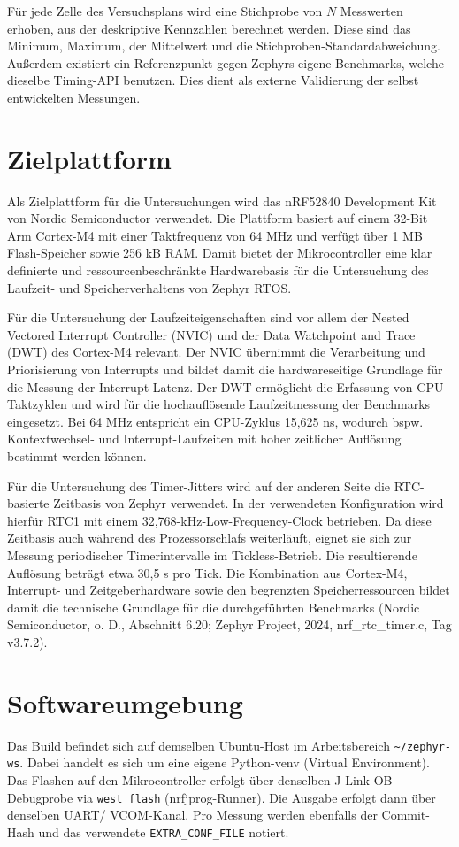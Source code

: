 F{\"u}r jede Zelle des Versuchsplans wird eine Stichprobe von \(N\) Messwerten erhoben, aus der deskriptive Kennzahlen berechnet werden. Diese sind das Minimum, Maximum, der Mittelwert und die Stichproben-Standardabweichung. Au{\ss}erdem existiert ein Referenzpunkt gegen Zephyrs eigene Benchmarks, welche dieselbe Timing-API benutzen. Dies dient als externe Validierung der selbst entwickelten Messungen.

\section{Zielplattform}
Als Zielplattform f{\"u}r die Untersuchungen wird das nRF52840 Development Kit von Nordic Semiconductor verwendet. Die Plattform basiert auf einem 32-Bit Arm Cortex-M4 mit einer Taktfrequenz von 64 MHz und verf{\"u}gt {\"u}ber 1 MB Flash-Speicher sowie 256 kB RAM. Damit bietet der Mikrocontroller eine klar definierte und ressourcenbeschr{\"a}nkte Hardwarebasis f{\"u}r die Untersuchung des Laufzeit- und Speicherverhaltens von Zephyr RTOS.

F{\"u}r die Untersuchung der Laufzeiteigenschaften sind vor allem der Nested Vectored Interrupt Controller (NVIC) und der Data Watchpoint and Trace (DWT) des Cortex-M4 relevant. Der NVIC {\"u}bernimmt die Verarbeitung und Priorisierung von Interrupts und bildet damit die hardwareseitige Grundlage f{\"u}r die Messung der Interrupt-Latenz. Der DWT erm{\"o}glicht die Erfassung von CPU-Taktzyklen und wird f{\"u}r die hochaufl{\"o}sende Laufzeitmessung der Benchmarks eingesetzt. Bei 64 MHz entspricht ein CPU-Zyklus 15,625 ns, wodurch bspw. Kontextwechsel- und Interrupt-Laufzeiten mit hoher zeitlicher Aufl{\"o}sung bestimmt werden k{\"o}nnen.

F{\"u}r die Untersuchung des Timer-Jitters wird auf der anderen Seite die RTC-basierte Zeitbasis von Zephyr verwendet. In der verwendeten Konfiguration wird hierf{\"u}r RTC1 mit einem 32,768-kHz-Low-Frequency-Clock betrieben. Da diese Zeitbasis auch w{\"a}hrend des Prozessorschlafs weiterl{\"a}uft, eignet sie sich zur Messung periodischer Timerintervalle im Tickless-Betrieb. Die resultierende Aufl{\"o}sung betr{\"a}gt etwa 30,5 \textmu{}s pro Tick. Die Kombination aus Cortex-M4, Interrupt- und Zeitgeberhardware sowie den begrenzten Speicherressourcen bildet damit die technische Grundlage f{\"u}r die durchgef{\"u}hrten Benchmarks (Nordic Semiconductor, o. D., Abschnitt 6.20; Zephyr Project, 2024, nrf\_rtc\_timer.c, Tag v3.7.2).

\section{Softwareumgebung}
Das Build befindet sich auf demselben Ubuntu-Host im Arbeitsbereich \lstinline[style=fileinline]|~/zephyr-ws|. Dabei handelt es sich um eine eigene Python-venv (Virtual Environment). Das Flashen auf den Mikrocontroller erfolgt {\"u}ber denselben J-Link-OB-Debugprobe via \lstinline[style=fileinline]|west flash| (nrfjprog-Runner). Die Ausgabe erfolgt dann {\"u}ber denselben UART/ VCOM-Kanal. Pro Messung werden ebenfalls der Commit-Hash und das verwendete \lstinline[style=fileinline]|EXTRA_CONF_FILE| notiert.

